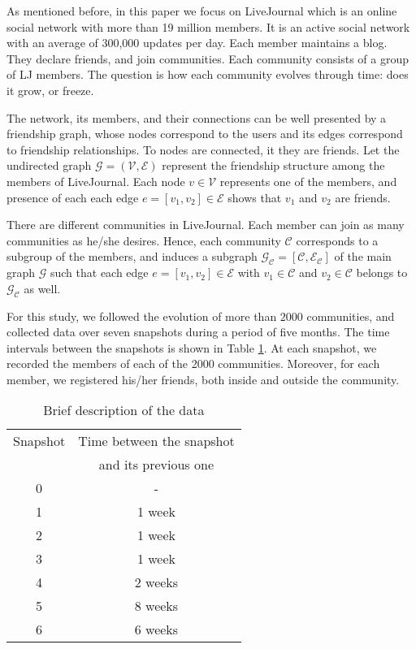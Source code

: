 As mentioned before, in this paper we focus on LiveJournal which is an online social network with more than 19 million members.  It is an active social network with an average of 300,000 updates per day. 
Each member maintains a blog. They  declare friends, and join communities. Each community consists of a group of LJ members. The question is how each community evolves through time: does it grow, or freeze. 

The network, its members, and their connections can be well presented by a  friendship graph, whose nodes correspond to the users and its edges correspond to friendship relationships. To nodes are connected, it they are friends. Let the undirected graph $\mathcal{G}=(\mathcal{V},\mathcal{E})$ represent the friendship structure among the members of LiveJournal. Each node $v\in\mathcal{V}$ represents one of the members, and presence of each each edge $e=[v_1,v_2]\in\mathcal{E}$ shows that $v_1$ and $v_2$ are friends. 

There are different communities in LiveJournal. Each member can join as many communities as he/she desires. Hence, each community $\mathcal{C}$ corresponds to a subgroup of the members, and induces a subgraph $\mathcal{G}_{\mathcal{C}}=[\mathcal{C},\mathcal{E}_{\mathcal{C}}]$ of the main graph $\mathcal{G}$ such that  each edge $e=[v_1,v_2]\in\mathcal{E}$ with $v_1\in\mathcal{C}$ and  $v_2\in\mathcal{C}$ belongs to $\mathcal{G}_{\mathcal{C}}$ as well.

For this study, we followed the evolution of more than $2000$ communities, and collected data over seven snapshots during a period of five months.  The time intervals between the snapshots is shown in Table \ref{tb:data}. At each snapshot, we recorded the  members of each of the 2000 communities. Moreover, for each  member, we registered his/her friends, both inside and outside the community. 

\begin{table}[htdp]
\begin{center}
\begin{tabular}{|c|c|}
\hline
Snapshot  & Time between the snapshot  \\
  & and its previous one \\ \hline
0 & -  \\ \hline
1 & 1 week \\ \hline
2 & 1 week \\ \hline
3 & 1 week \\ \hline
4 & 2 weeks \\ \hline
5 & 8 weeks \\ \hline
6 & 6 weeks \\ \hline
\end{tabular}
\end{center}\caption{Brief description of the data}
\label{tb:data}
\end{table}%

